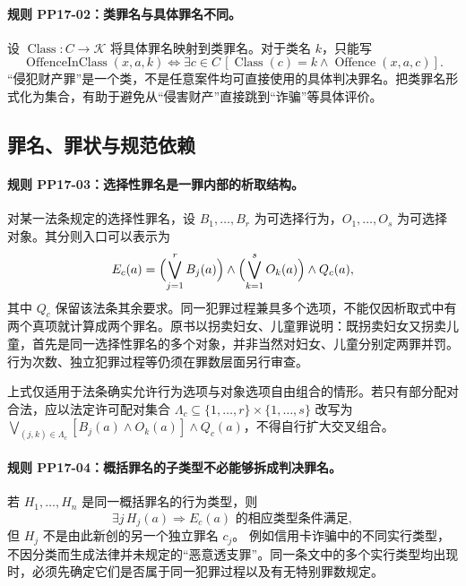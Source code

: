 \paragraph{规则 PP17-02：类罪名与具体罪名不同。}
\mbox{}\par
设 $\operatorname{Class}:C\to\mathcal K$ 将具体罪名映射到类罪名。对于类名 $k$，只能写
\[
\operatorname{OffenceInClass}(x,a,k)
\Longleftrightarrow
\exists c\in C\,[\operatorname{Class}(c)=k\land\operatorname{Offence}(x,a,c)].
\]
“侵犯财产罪”是一个类，不是任意案件均可直接使用的具体判决罪名。把类罪名形式化为集合，有助于避免从“侵害财产”直接跳到“诈骗”等具体评价。

\subsection{罪名、罪状与规范依赖}
\paragraph{规则 PP17-03：选择性罪名是一罪内部的析取结构。}
\mbox{}\par
对某一法条规定的选择性罪名，设 $B_1,\ldots,B_r$ 为可选择行为，$O_1,\ldots,O_s$ 为可选择对象。其分则入口可以表示为
\[
E_c(a)=\Bigl(\bigvee_{j=1}^{r}B_j(a)\Bigr)
\land\Bigl(\bigvee_{k=1}^{s}O_k(a)\Bigr)\land Q_c(a),
\]
其中 $Q_c$ 保留该法条其余要求。同一犯罪过程兼具多个选项，不能仅因析取式中有两个真项就计算成两个罪名。原书以拐卖妇女、儿童罪说明：既拐卖妇女又拐卖儿童，首先是同一选择性罪名的多个对象，并非当然对妇女、儿童分别定两罪并罚。行为次数、独立犯罪过程等仍须在罪数层面另行审查。

上式仅适用于法条确实允许行为选项与对象选项自由组合的情形。若只有部分配对合法，应以法定许可配对集合 $\Lambda_c\subseteq\{1,\ldots,r\}\times\{1,\ldots,s\}$ 改写为 $\bigvee_{(j,k)\in\Lambda_c}[B_j(a)\land O_k(a)]\land Q_c(a)$，不得自行扩大交叉组合。

\paragraph{规则 PP17-04：概括罪名的子类型不必能够拆成判决罪名。}
\mbox{}\par
若 $H_1,\ldots,H_n$ 是同一概括罪名的行为类型，则
\[
\exists j\,H_j(a)\Longrightarrow E_c(a)\text{ 的相应类型条件满足},
\]
但 $H_j$ 不是由此新创的另一个独立罪名 $c_j$。
例如信用卡诈骗中的不同实行类型，不因分类而生成法律并未规定的“恶意透支罪”。同一条文中的多个实行类型均出现时，必须先确定它们是否属于同一犯罪过程以及有无特别罪数规定。

